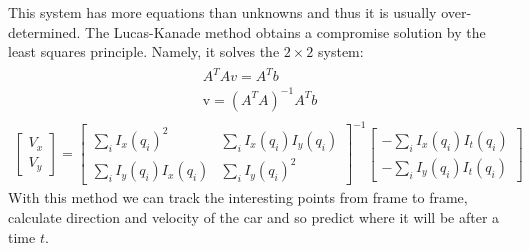 This system has more equations than unknowns and thus it is usually over-determined. The Lucas-Kanade method obtains a compromise solution by the least squares principle. Namely, it solves the $2\times2$ system:
\begin{align}
\begin{split}
A^{T}Av=A^{T}b\\
{\mathrm  {v}}=(A^{T}A)^{{-1}}A^{T}b
\end{split}
\end{align}
\begin{align}
{\begin{bmatrix}V_{x}\\[10pt]V_{y}\end{bmatrix}}={\begin{bmatrix}\sum _{i}I_{x}(q_{i})^{2}&\sum _{i}I_{x}(q_{i})I_{y}(q_{i})\\[10pt]\sum _{i}I_{y}(q_{i})I_{x}(q_{i})&\sum _{i}I_{y}(q_{i})^{2}\end{bmatrix}}^{{-1}}{\begin{bmatrix}-\sum _{i}I_{x}(q_{i})I_{t}(q_{i})\\[10pt]-\sum _{i}I_{y}(q_{i})I_{t}(q_{i})\end{bmatrix}}
\end{align}
With this method we can track the interesting points from frame to frame, calculate direction and velocity of the car and so predict where it will be after a time $t$.\\
